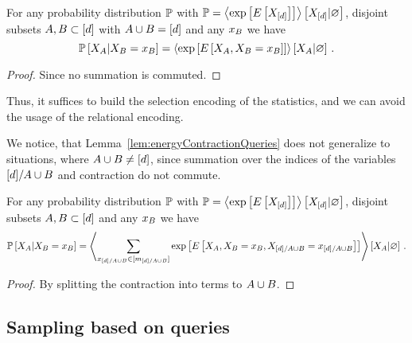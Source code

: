 \begin{lemma}\label{lem:energyContractionQueries} %
	For any probability distribution $\mathbb{P}$ with $\mathbb{P}= \left\langle \mathrm{exp}\left[E\left[X_{[d]}\right]\right]\right\rangle \left[ X_{[d]} | \varnothing \right]$, disjoint subsets $A,B \subset [d]$ with $A\cup B=[d]$  and any $x_{B}$ we have
		\[ \mathbb{P}\left[X_{A}|X_{B}=x_{B}\right] 
			= \left\langle 
				\mathrm{exp}\left[E\left[X_{A},X_{B}=x_{B}\right]\right]
		\right\rangle \left[ X_{A} | \varnothing \right] \, .\]
\end{lemma}
\begin{proof}
	Since no summation is commuted.
\end{proof}

Thus, it suffices to build the selection encoding of the statistics, and we can avoid the usage of the relational encoding.

% 
We notice, that Lemma~\ref{lem:energyContractionQueries} does not generalize to situations, where $A\cup B\neq[d]$, since summation over the indices of the variables $[d]/A\cup B$ and contraction do not commute.


\begin{lemma}  %
	For any probability distribution $\mathbb{P}$ with $\mathbb{P}= \left\langle \mathrm{exp}\left[E\left[X_{[d]}\right]\right]\right\rangle \left[ X_{[d]} | \varnothing \right]$, disjoint subsets $A,B \subset [d]$ and any $x_{B}$ we have
		\[ \mathbb{P}\left[X_{A}|X_{B}=x_{B}\right] 
			=
			\left\langle 
			 \sum_{x_{[d]/A\cup B}\in[m_{[d]/A\cup B}]} 
				 \mathrm{exp}\left[E\left[X_{A},X_{B}=x_{B},X_{[d]/A\cup B}=x_{[d]/A\cup B}\right]\right]
		\right\rangle \left[ X_{A} | \varnothing \right] \, .\]
\end{lemma}
\begin{proof}
	By splitting the contraction into terms to $A\cup B$. %
\end{proof}




\subsection{Sampling based on queries}


